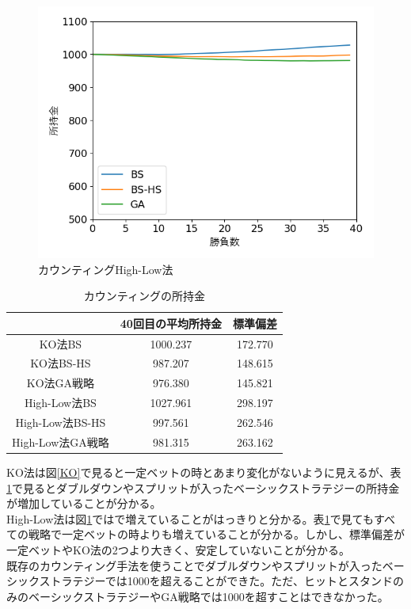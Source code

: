 \begin{figure}[H]
 \begin{center} 
  \includegraphics[width=0.7\linewidth]{./figure/betsimulation-Hi-Lo}
  \caption{カウンティングHigh-Low法\label{Hi-Lo}}
 \end{center}
\end{figure}

\begin{table}[H]
 \caption{カウンティングの所持金\label{countting}}
 \begin{center}
  \begin{tabular}{|c|c|c|}
  \hline  & 40回目の平均所持金 & 標準偏差 \\
  \hline KO法BS & 1000.237 & 172.770\\
  \hline KO法BS-HS & 987.207 & 148.615 \\
  \hline KO法GA戦略 & 976.380 & 145.821\\
  \hline High-Low法BS & 1027.961 & 298.197\\
  \hline High-Low法BS-HS  & 997.561 & 262.546\\
  \hline High-Low法GA戦略 & 981.315 & 263.162\\
  \hline
  \end{tabular}
 \end{center}
\end{table}

KO法は図\ref{KO}で見ると一定ベットの時とあまり変化がないように見えるが、表\ref{countting}で見るとダブルダウンやスプリットが入ったベーシックストラテジーの所持金が増加していることが分かる。\\
 High-Low法は図\ref{Hi-Lo}ではで増えていることがはっきりと分かる。表\ref{countting}で見てもすべての戦略で一定ベットの時よりも増えていることが分かる。しかし、標準偏差が一定ベットやKO法の2つより大きく、安定していないことが分かる。\\
 既存のカウンティング手法を使うことでダブルダウンやスプリットが入ったベーシックストラテジーでは1000を超えることができた。ただ、ヒットとスタンドのみのベーシックストラテジーやGA戦略では1000を超すことはできなかった。

